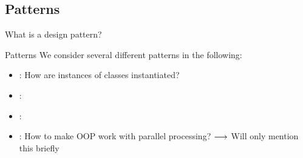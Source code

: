 
\subsection{Patterns}

\begin{frame}{What is a design pattern?}
	
\end{frame}



\begin{frame}{Patterns}
	We consider several different patterns in the following:
	
	\begin{itemize}
		\item 
		: How are instances of classes instantiated? 
		\item 
		:
		\item 
		:
		\item 
		: How to make OOP work with parallel processing? $\longrightarrow$ Will only mention this briefly
	\end{itemize}
\end{frame}
%
%
%